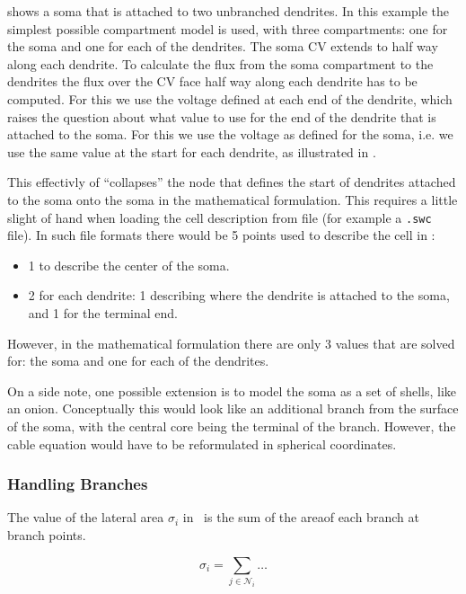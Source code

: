  shows a soma that is attached to two unbranched dendrites.
In this example the simplest possible compartment model is used, with three compartments: one for the soma and one for each of the dendrites.
The soma CV extends to half way along each dendrite.
To calculate the flux from the soma compartment to the dendrites the flux over the CV face half way along each dendrite has to be computed.
For this we use the voltage defined at each end of the dendrite, which raises the question about what value to use for the end of the dendrite that is attached to the soma.
For this we use the voltage as defined for the soma, i.e. we use the same value at the start for each dendrite, as illustrated in .

This effectivly of ``collapses'' the node that defines the start of dendrites attached to the soma onto the soma in the mathematical formulation.
This requires a little slight of hand when loading the cell description from file (for example a \verb!.swc! file).
In such file formats there would be 5 points used to describe the cell in :
\begin{itemize}
    \item 1 to describe the center of the soma.
    \item 2 for each dendrite: 1 describing where the dendrite is attached to the soma, and 1 for the terminal end.
\end{itemize}
However, in the mathematical formulation there are only 3 values that are solved for: the soma and one for each of the dendrites.

On a side note, one possible extension is to model the soma as a set of shells, like an onion.
Conceptually this would look like an additional branch from the surface of the soma, with the central core being the terminal of the branch.
However, the cable equation would have to be reformulated in spherical coordinates.


\subsubsection{Handling Branches}
The value of the lateral area $\sigma_i$ in~ is the sum of the areaof each branch at branch points.



\begin{equation}
    \sigma_i = \sum_{j\in\mathcal{N}_i} {\dots}
\end{equation}

